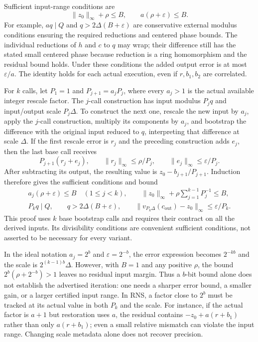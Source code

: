 Sufficient input-range conditions are
\[
\|z_0\|_\infty+\rho\leq B,
\qquad a(\rho+\varepsilon)\leq B.
\]
For example, $aq\mid Q$ and $q>2\Delta(B+\varepsilon)$ are conservative external modulus conditions ensuring the required reductions and centered phase bounds. The individual reductions of $h$ and $c$ to $q$ may wrap; their difference still has the stated small centered phase because reduction is a ring homomorphism and the residual bound holds. Under these conditions the added output error is at most $\varepsilon/a$. The identity holds for each actual execution, even if $r,b_1,b_2$ are correlated.

For $k$ calls, let $P_1=1$ and $P_{j+1}=a_jP_j$, where every $a_j>1$ is the actual available integer rescale factor. The $j$-call construction has input modulus $P_jq$ and input/output scale $P_j\Delta$. To construct the next one, rescale the new input by $a_j$, apply the $j$-call construction, multiply its components by $a_j$, and bootstrap the difference with the original input reduced to $q$, interpreting that difference at scale $\Delta$. If the first rescale error is $r_j$ and the preceding construction adds $e_j$, then the last base call receives
\[
P_{j+1}(r_j+e_j),\qquad
\|r_j\|_\infty\leq\rho/P_j,\qquad
\|e_j\|_\infty\leq\varepsilon/P_j.
\]
After subtracting its output, the resulting value is $z_0-b_{j+1}/P_{j+1}$. Induction therefore gives the sufficient conditions and bound
\begin{gather*}
a_j(\rho+\varepsilon)\leq B\quad(1\leq j<k),\qquad
\|z_0\|_\infty+\rho\sum_{j=1}^{k-1}P_j^{-1}\leq B,\\
P_kq\mid Q,\qquad q>2\Delta(B+\varepsilon),\qquad
\|v_{P_k\Delta}(c_{\mathrm{out}})-z_0\|_\infty\leq\varepsilon/P_k.
\end{gather*}
This proof uses $k$ base bootstrap calls and requires their contract on all the derived inputs. Its divisibility conditions are convenient sufficient conditions, not asserted to be necessary for every variant.

In the ideal notation $a_j=2^b$ and $\varepsilon=2^{-b}$, the error expression becomes $2^{-kb}$ and the scale is $2^{(k-1)b}\Delta$. However, with $B=1$ and any positive $\rho$, the bound $2^b(\rho+2^{-b})>1$ leaves no residual input margin. Thus a $b$-bit bound alone does not establish the advertised iteration: one needs a sharper error bound, a smaller gain, or a larger certified input range. In RNS, a factor close to $2^b$ must be tracked at its actual value in both $P_k$ and the scale. For instance, if the actual factor is $a+1$ but restoration uses $a$, the residual contains $-z_0+a(r+b_1)$ rather than only $a(r+b_1)$; even a small relative mismatch can violate the input range. Changing scale metadata alone does not recover precision.

